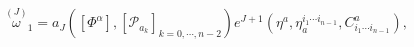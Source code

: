 \begin{equation}
\stackrel{(J)}{\omega }_{1}=a_{J}\left( \left[ \Phi ^{\alpha }\right]
,\left[ \mathcal{P}_{a_{k}}\right] _{k=0,\cdots ,n-2}\right) e^{J+1}\left(
\eta ^{a},\eta _{a}^{i_{1}\cdots i_{n-1}},C_{i_{1}\cdots i_{n-1}}^{a}\right)
,  \label{c5}
\end{equation}

